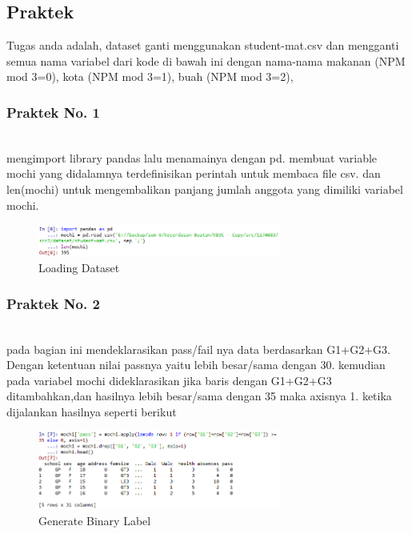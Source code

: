 \subsection{Praktek}
Tugas anda adalah, dataset ganti menggunakan student-mat.csv dan mengganti semua nama variabel dari kode di bawah ini dengan nama-nama makanan (NPM mod 3=0), kota (NPM mod 3=1), buah (NPM mod 3=2),
 

\subsubsection{Praktek No. 1}
\hfill\\

mengimport library pandas lalu menamainya dengan pd. membuat variable mochi yang didalamnya terdefinisikan perintah untuk membaca file csv. dan len(mochi) untuk mengembalikan panjang jumlah anggota yang dimiliki variabel mochi. 

\begin{figure}[H]
    \includegraphics[width=8cm]{figures/1174083/figures2/p1.png}
    \centering
    \caption{Loading Dataset}
\end{figure}

\subsubsection{Praktek No. 2}
\hfill\\

pada bagian ini mendeklarasikan pass/fail nya data berdasarkan G1+G2+G3. Dengan ketentuan nilai passnya yaitu lebih besar/sama dengan 30. kemudian pada variabel mochi dideklarasikan jika baris dengan G1+G2+G3 ditambahkan,dan hasilnya lebih besar/sama dengan 35 maka axisnya 1. ketika dijalankan hasilnya seperti berikut

\begin{figure}[H]
    \includegraphics[width=8cm]{figures/1174083/figures2/p2.png}
    \centering
    \caption{Generate Binary Label}
\end{figure}

